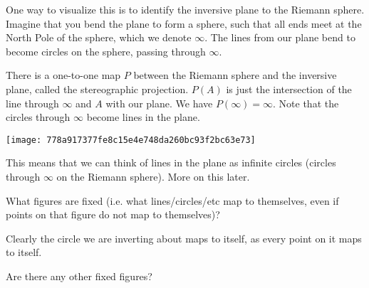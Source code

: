 One way to visualize this is to identify the inversive plane to the Riemann sphere. Imagine that you bend the plane to form a sphere, such that all ends meet at the North Pole of the sphere, which we denote $\infty$. The lines from our plane bend to become circles on the sphere, passing through $\infty$.

There is a one-to-one map $P$ between the Riemann sphere and the inversive plane, called the stereographic projection. $P(A)$ is just the intersection of the line through $\infty$ and $A$ with our plane. We have $P(\infty)=\infty$. Note that the circles through $\infty$ become lines in the plane.

\texttt{[image: 778a917377fe8c15e4e748da260bc93f2bc63e73]}

This means that we can think of lines in the plane as infinite circles (circles through $\infty$ on the Riemann sphere). More on this later.

What figures are fixed (i.e. what lines/circles/etc map to themselves, even if points on that figure do not map to themselves)?


Clearly the circle we are inverting about maps to itself, as every point on it maps to itself.

Are there any other fixed figures?






